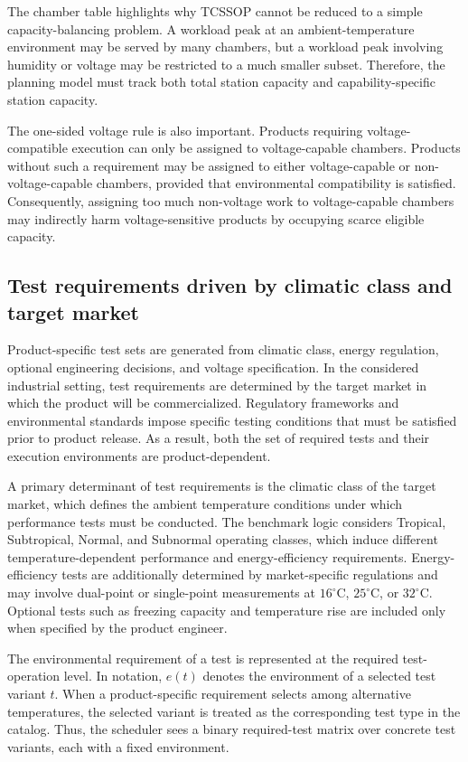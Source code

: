 \documentclass[11pt]{article}
\begin{document}
The chamber table highlights why TCSSOP cannot be reduced to a simple capacity-balancing problem. A workload peak at an ambient-temperature environment may be served by many chambers, but a workload peak involving humidity or voltage may be restricted to a much smaller subset. Therefore, the planning model must track both total station capacity and capability-specific station capacity.

The one-sided voltage rule is also important. Products requiring voltage-compatible execution can only be assigned to voltage-capable chambers. Products without such a requirement may be assigned to either voltage-capable or non-voltage-capable chambers, provided that environmental compatibility is satisfied. Consequently, assigning too much non-voltage work to voltage-capable chambers may indirectly harm voltage-sensitive products by occupying scarce eligible capacity.

\subsection{Test requirements driven by climatic class and target market}
\label{subsec:req_generation}

Product-specific test sets are generated from climatic class, energy regulation, optional engineering decisions, and voltage specification. In the considered industrial setting, test requirements are determined by the target market in which the product will be commercialized. Regulatory frameworks and environmental standards impose specific testing conditions that must be satisfied prior to product release. As a result, both the set of required tests and their execution environments are product-dependent.

A primary determinant of test requirements is the climatic class of the target market, which defines the ambient temperature conditions under which performance tests must be conducted. The benchmark logic considers Tropical, Subtropical, Normal, and Subnormal operating classes, which induce different temperature-dependent performance and energy-efficiency requirements. Energy-efficiency tests are additionally determined by market-specific regulations and may involve dual-point or single-point measurements at \(16^\circ\mathrm{C}\), \(25^\circ\mathrm{C}\), or \(32^\circ\mathrm{C}\). Optional tests such as freezing capacity and temperature rise are included only when specified by the product engineer.

The environmental requirement of a test is represented at the required test-operation level. In notation, \(e(t)\) denotes the environment of a selected test variant \(t\). When a product-specific requirement selects among alternative temperatures, the selected variant is treated as the corresponding test type in the catalog. Thus, the scheduler sees a binary required-test matrix over concrete test variants, each with a fixed environment.
\end{document}
